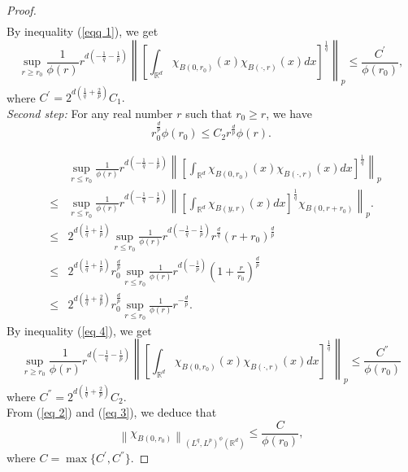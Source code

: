 \documentclass[10pt,a4paper]{amsart}
\begin{document}
\begin{proof}
\begin{eqnarray*}
\end{eqnarray*} 
By inequality (\ref{eqq 1}), we get 
\begin{equation}\label{eq 2}
\sup_{r \ge r_{0}} \frac{1}{\phi(r)} r^{d(-\frac{1}{q}-\frac{1}{p})} \left\|\left[\int_{\mathbb R^{d}}  \chi_{B(0,r_{0})}(x)\chi_{B(\cdot,r)}(x)dx\right]^{\frac{1}{q}}\right\|_p \leq \frac{C^{'}}{\phi(r_{0})},
\end{equation}
where $C^{'}= 2^{d(\frac{1}{q}+\frac{2}{p})}C_{1}.  $\\
\textit{Second step:} For any real number $r$ such that $ r_{0} \geq r$, we have
\begin{equation}\label{eq 4}
r_{0}^{\frac{d}{p}}\phi(r_{0}) \leq C_{2} r^{\frac{d}{p}}\phi(r).
\end{equation}

\begin{eqnarray*}
&&\sup_{r \leq r_{0}} \frac{1}{\phi(r)} r^{d(-\frac{1}{q}-\frac{1}{p})} \left\|\left[\int_{\mathbb R^{d}}  \chi_{B(0,r_{0})}(x)\chi_{B(\cdot,r)}(x)dx\right]^{\frac{1}{q}}\right\|_p \\&\leq& \sup_{r \leq r_{0}} \frac{1}{\phi(r)} r^{d(-\frac{1}{q}-\frac{1}{p})} \left\|\left[\int_{\mathbb R^{d}}  \chi_{B(y,r)}(x)dx\right]^{\frac{1}{q}}\chi_{B(0,r+r_{0})}\right\|_p. \\
 &\leq& 2^{d(\frac{1}{q}+\frac{1}{p})}
\sup_{r \leq r_{0}} \frac{1}{\phi(r)} r^{d(-\frac{1}{q}-\frac{1}{p})}r^{\frac{d}{q}} (r+r_{0})^{\frac{d}{p}}\\
&\leq& 2^{d(\frac{1}{q}+\frac{1}{p})}r_{0}^{\frac{d}{p}}\sup_{r \leq r_{0}} \frac{1}{\phi(r)} r^{d(-\frac{1}{p})} (1+\frac{r}{r_{0}})^{\frac{d}{p}} \\
&\leq& 2^{d(\frac{1}{q}+\frac{2}{p})}r^{\frac{d}{p}}_{0}\sup_{r \leq r_{0}} \frac{1}{\phi(r)} r^{-\frac{d}{p}}.
\end{eqnarray*} 
By inequality (\ref{eq 4}), we get 
\begin{equation}\label{eq 3}
\sup_{r \ge r_{0}} \frac{1}{\phi(r)} r^{d(-\frac{1}{q}-\frac{1}{p})} \left\|\left[\int_{\mathbb R^{d}}  \chi_{B(0,r_{0})}(x)\chi_{B(\cdot,r)}(x)dx\right]^{\frac{1}{q}}\right\|_p \leq \frac{C^{''}}{\phi(r_{0})}
\end{equation}
where $C^{''}= 2^{d(\frac{1}{q}+\frac{2}{p})}C_{2}.  $\\
From (\ref{eq 2}) and (\ref{eq 3}), we deduce that $$\left\| \chi_{B(0,r_{0})} \right\|_{(L^{q},L^{p})^{\phi }(\mathbb{R}^{d})} \leq \frac{C}{\phi(r_{0})},$$ where $C=\max\{C^{'},  C^{''}  \}$.
\end{proof}
\end{document}
